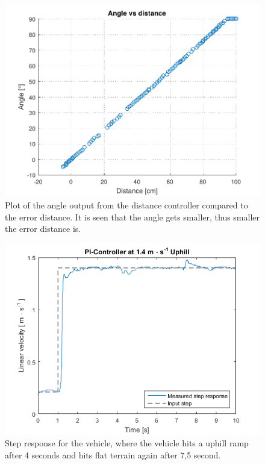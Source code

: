 \begin{figure}[H]
  \centering
	\includegraphics[scale=0.8]{figures/AccTest7.pdf}
	\caption{Plot of the angle output from the distance controller compared to the error distance. It is seen that the angle gets smaller, thus smaller the error distance is.}
	\label{AccT7fig}
\end{figure}

\begin{figure}[H]
  \centering
	\includegraphics[scale=0.8]{figures/AccTest8U.png}
	\caption{Step response for the vehicle, where the vehicle hits a uphill ramp after 4 seconds and hits flat terrain again after 7,5 second.}
	\label{AccT8Ufig}
\end{figure}


